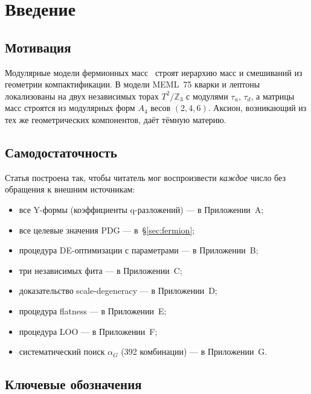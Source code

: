 \documentclass[12pt,a4paper]{article}
\numberwithin{equation}{section}
\begin{document}
\section{Введение}

\subsection{Мотивация}

Модулярные модели фермионных масс~\cite{Feruglio2017,Kobayashi2019}
строят иерархию масс и смешиваний из геометрии компактификации.
В модели MEML~75 кварки и лептоны локализованы на двух независимых
торах $T^2/\mathbb{Z}_3$ с модулями $\tau_u$, $\tau_d$, а матрицы
масс строятся из модулярных форм $A_4$ весов $(2,4,6)$.
Аксион, возникающий из тех же геометрических компонентов, даёт
тёмную материю.

\subsection{Самодостаточность}

Статья построена так, чтобы читатель мог воспроизвести
\emph{каждое} число без обращения к внешним источникам:
\begin{itemize}[leftmargin=1.5em,itemsep=0.05em]
\item все Y-формы (коэффициенты q-разложений) --- в Приложении~A;
\item все целевые значения PDG --- в~\S\ref{sec:fermion};
\item процедура DE-оптимизации с параметрами --- в Приложении~B;
\item три независимых фита --- в Приложении~C;
\item доказательство scale-degeneracy --- в Приложении~D;
\item процедура flatness --- в Приложении~E;
\item процедура LOO --- в Приложении~F;
\item систематический поиск $\alpha_G$ (392 комбинации) --- в Приложении~G.
\end{itemize}

\subsection{Ключевые обозначения}
\label{sec:statuses}
\end{document}
